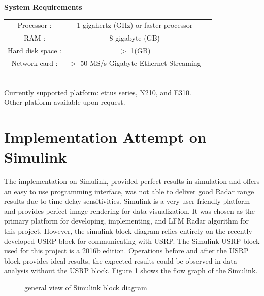 \documentclass[letterpaper, 12 pt, conference]{report}
\numberwithin{figure}{section}
\begin{document}
\begin{appendices}
\textbf{System Requirements}\\
\begin{tabular}{|c|c|c|}
\hline
Processor :	&		1 gigahertz (GHz) or faster processor\\
RAM :			&	8 gigabyte (GB)	\\
Hard disk space :	& $>$ 1(GB)\\
Network card :	&	$>$ 50 MS/s Gigabyte Ethernet Streaming\\\hline
\end{tabular}\\
\fontsize{12}{15}\selectfont
Currently supported platform: ettus series, N210, and E310. \\
Other platform available upon request. 
\clearpage

\section{Implementation Attempt on Simulink}
\label{app:simuerror}
The implementation on Simulink, provided perfect results in simulation and offers an easy to use programming interface, was not able to deliver good Radar range results due to time delay sensitivities. Simulink is a very user friendly platform and provides perfect image rendering for data visualization. It was chosen as the primary platform for developing, implementing, and LFM Radar algorithm for this project. However, the simulink block diagram relies entirely on the recently developed USRP block for communicating with USRP. The Simulink USRP block used for this project is a 2016b edition. Operations before and after the USRP block provides ideal results, the expected results could be observed in data analysis without the USRP block. Figure \ref{fig:simugen} shows the flow graph of the Simulink.\\
\begin{figure}[h]
\centering{}
\caption{general view of Simulink block diagram}
\label{fig:simugen}
\end{figure}
\FloatBarrier

\end{appendices}
\end{document}
